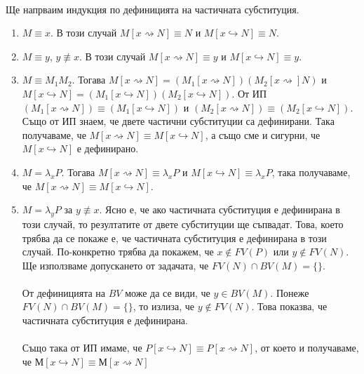 \documentclass[12pt]{article}
\begin{document}
\paragraph*{}
Ще напрваим индукция по дефиницията на частичната субституция.
\begin{enumerate}
	\item $M \equiv x$. В този случай $M[x \rightsquigarrow N] \equiv N$ и $M[x \hookrightarrow N] \equiv N$.
	\item $M \equiv y$, $y \not\equiv x$. В този случай $M[x \rightsquigarrow N] \equiv y$ и $M[x \hookrightarrow N] \equiv y$.
	\item $M \equiv M_1M_2$. Тогава $M[x \rightsquigarrow N] = (M_1[x \rightsquigarrow N])(M_2[x \rightsquigarrow] N)$ и $M[x \hookrightarrow N] = (M_1[x \hookrightarrow N])(M_2[x \hookrightarrow N])$. От ИП $(M_1[x \rightsquigarrow N]) \equiv (M_1[x \hookrightarrow N])$ и $(M_2[x \rightsquigarrow N]) \equiv (M_2[x \hookrightarrow N])$. Също от ИП знаем, че двете частични субституции са дефинирани. Така получаваме, че $M[x \rightsquigarrow N] \equiv M[x \hookrightarrow N]$, а също сме и сигурни, че $M[x \hookrightarrow N]$ е дефинирано.
	\item $M = \lambda_x P$. Тогава $M[x \rightsquigarrow N] \equiv \lambda_x P$ и $M[x \hookrightarrow N] \equiv \lambda_x P$, така получаваме, че $M[x \rightsquigarrow N] \equiv M[x \hookrightarrow N]$.
	\item $M = \lambda_y P$ за $y \not\equiv x$. Ясно е, че ако частичната субституция е дефинирана в този случай, то резултатите от двете субституции ще съпвадат. Това, което трябва да се покаже е, че частичната субституция е дефинирана в този случай. По-конкретно трябва да покажем, че $x \not\in FV(P)$ или $y \not\in FV(N)$. Ще използваме допускането от задачата, че $FV(N) \cap BV(M) = \{ \}$. 
	\paragraph*{}
	От дефиницията на $BV$ може да се види, че $y \in BV(M)$. Понеже $FV(N) \cap BV(M) = \{ \}$, то излиза, че $y \not\in FV(N)$. Това показва, че частичната субституция е дефинирана.
	\paragraph*{}
	Също така от ИП имаме, че $P[x \hookrightarrow N] \equiv P[x \rightsquigarrow N]$, от което и получаваме, че $М[x \hookrightarrow N] \equiv М[x \rightsquigarrow N]$


\end{enumerate}
\end{document}
